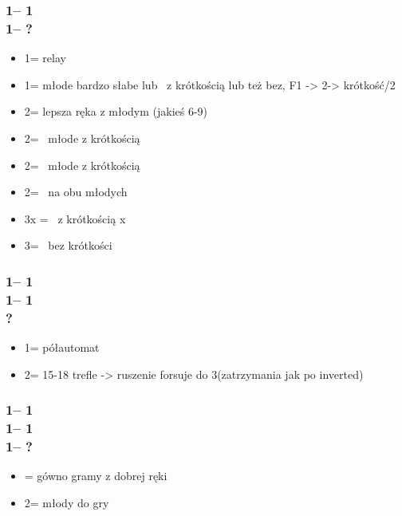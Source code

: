 \documentclass[12pt, a4paper]{article}
\begin{document}
\subsubsection*{1\clubs -- 1\diams \\
                1\hearts -- ?}
\begin{itemize}
    \item 1\spades = relay 
    \item 1\nt = młode bardzo słabe lub \gf\ z krótkością lub też bez, 
    F1 -> 2\minor -> krótkość/2\nt 
    \item 2\minor = lepsza ręka z młodym (jakieś 6-9) 
    \item 2\hearts = \inv\ młode z krótkością 
    \item 2\spades = \inv\ młode z krótkością 
    \item 2\nt = \inv\ na obu młodych 
    \item 3x = \gf\ \diams z krótkością x 
    \item 3\diams = \gf\ \diams bez krótkości
\end{itemize}

\subsubsection*{1\clubs -- 1\diams \\
                1\hearts -- 1\spades\\
                ?}
\begin{itemize}
    \item 1\nt = półautomat 
    \item 2\clubs = 15-18 trefle \nf -> ruszenie forsuje do 3\clubs (zatrzymania jak po inverted)
\end{itemize}

\subsubsection*{1\clubs -- 1\diams \\
                1\hearts -- 1\spades\\
                1\nt -- ?}
\begin{itemize}
    \item \pass = gówno gramy z dobrej ręki 
    \item 2\minor = młody do gry
\end{itemize}
\end{document}
